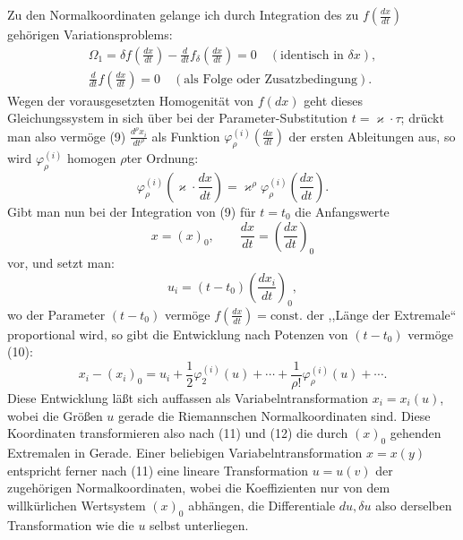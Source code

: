 Zu den Normalkoordinaten gelange ich durch Integration des zu
\(f\!\left(\frac{dx}{dt}\right)\) gehörigen Variationsproblems:
\begin{equation}
\begin{gathered}
\Omega_1=\delta f\!\left(\frac{dx}{dt}\right)
-\frac{d}{dt}f_\delta\!\left(\frac{dx}{dt}\right)=0
\quad(\text{identisch in }\delta x),\\
\frac{d}{dt}f\!\left(\frac{dx}{dt}\right)=0
\quad(\text{als Folge oder Zusatzbedingung}).
\end{gathered}
\tag{9}
\end{equation}
Wegen der vorausgesetzten Homogenität von \(f(dx)\) geht dieses
Gleichungssystem in sich über bei der Parameter-Substitution
\(t=\varkappa\cdot\tau\); drückt man also vermöge (9)
\(\frac{d^\rho x_i}{dt^\rho}\) als Funktion
\(\varphi_\rho^{(i)}\!\left(\frac{dx}{dt}\right)\) der ersten
Ableitungen aus, so wird \(\varphi_\rho^{(i)}\) homogen \(\rho\)ter
Ordnung:
\begin{equation}
\varphi_\rho^{(i)}\!\left(\varkappa\cdot\frac{dx}{dt}\right)
=\varkappa^\rho\varphi_\rho^{(i)}\!\left(\frac{dx}{dt}\right).
\tag{10}
\end{equation}
Gibt man nun bei der Integration von (9) für \(t=t_0\) die Anfangswerte
\[
x=(x)_0,\qquad \frac{dx}{dt}=\left(\frac{dx}{dt}\right)_0
\]
vor, und setzt man:
\begin{equation}
u_i=(t-t_0)\left(\frac{dx_i}{dt}\right)_0,
\tag{11}
\end{equation}
wo der Parameter \((t-t_0)\) vermöge
\(f\!\left(\frac{dx}{dt}\right)=\mathrm{const.}\) der ,,Länge der
Extremale`` proportional wird, so gibt die Entwicklung nach Potenzen
von \((t-t_0)\) vermöge (10):
\begin{equation}
x_i-(x_i)_0=u_i+\frac12\varphi_2^{(i)}(u)+\cdots+
\frac{1}{\rho!}\varphi_\rho^{(i)}(u)+\cdots .
\tag{12}
\end{equation}
Diese Entwicklung läßt sich auffassen als Variabelntransformation
\(x_i=x_i(u)\), wobei die Größen \(u\) gerade die Riemannschen
Normalkoordinaten sind. Diese Koordinaten transformieren also nach
(11) und (12) die durch \((x)_0\) gehenden Extremalen in Gerade. Einer
beliebigen Variabelntransformation \(x=x(y)\) entspricht ferner nach
(11) eine lineare Transformation \(u=u(v)\) der zugehörigen
Normalkoordinaten, wobei die Koeffizienten nur von dem willkürlichen
Wertsystem \((x)_0\) abhängen, die Differentiale \(du,\delta u\) also
derselben Transformation wie die \(u\) selbst unterliegen.

